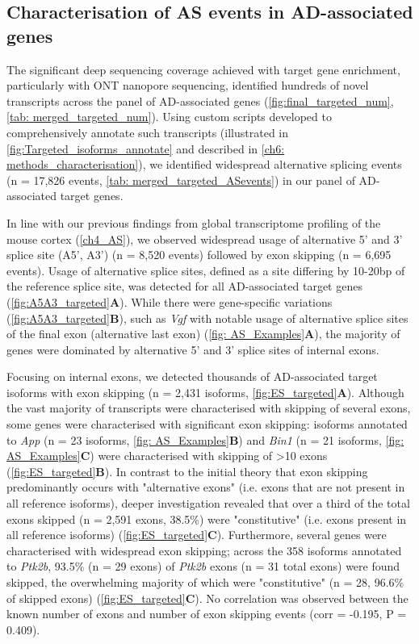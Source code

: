 \begin{figure}[!htp]
	\label{fig:ont_isoseq_description}
\end{figure}


\clearpage

\subsection{Characterisation of AS events in AD-associated genes}
The significant deep sequencing coverage achieved with target gene enrichment, particularly with ONT nanopore sequencing, identified hundreds of novel transcripts across the panel of AD-associated genes (\cref{fig:final_targeted_num}, \cref{tab: merged_targeted_num}). Using custom scripts developed to comprehensively annotate such transcripts (illustrated in \cref{fig:Targeted_isoforms_annotate} and described in \cref{ch6: methods_characterisation}), we identified widespread alternative splicing events (n = 17,826 events, \cref{tab: merged_targeted_ASevents}) in our panel of AD-associated target genes.

In line with our previous findings from global transcriptome profiling of the mouse cortex (\cref{ch4_AS}), we observed widespread usage of alternative 5' and 3' splice site (A5', A3') (n = 8,520 events) followed by exon skipping (n = 6,695 events). Usage of alternative splice sites, defined as a site differing by 10-20bp of the reference splice site, was detected for all AD-associated target genes (\cref{fig:A5A3_targeted}\textbf{A}). While there were gene-specific variations (\cref{fig:A5A3_targeted}\textbf{B}), such as \textit{Vgf} with notable usage of alternative splice sites of the final exon (alternative last exon) (\cref{fig: AS_Examples}\textbf{A}), the majority of genes were dominated by alternative 5' and 3' splice sites of internal exons.

Focusing on internal exons, we detected thousands of AD-associated target isoforms with exon skipping (n = 2,431 isoforms, \cref{fig:ES_targeted}\textbf{A}). Although the vast majority of transcripts were characterised with skipping of several exons, some genes were characterised with significant exon skipping: isoforms annotated to \textit{App} (n = 23 isoforms, \cref{fig: AS_Examples}\textbf{B}) and \textit{Bin1} (n = 21 isoforms, \cref{fig: AS_Examples}\textbf{C}) were characterised with skipping of >10 exons (\cref{fig:ES_targeted}\textbf{B}). In contrast to the initial theory that exon skipping predominantly occurs with "alternative exons" (i.e. exons that are not present in all reference isoforms), deeper investigation revealed that over a third of the total exons skipped (n = 2,591 exons, 38.5\%) were "constitutive" (i.e. exons present in all reference isoforms) (\cref{fig:ES_targeted}\textbf{C}). Furthermore, several genes were characterised with widespread exon skipping; across the 358 isoforms annotated to \textit{Ptk2b}, 93.5\% (n = 29 exons)  of \textit{Ptk2b} exons (n = 31 total exons) were found skipped, the overwhelming majority of which were "constitutive" (n = 28, 96.6\% of skipped exons) (\cref{fig:ES_targeted}\textbf{C}). No correlation was observed between the known number of exons and number of exon skipping events (corr = -0.195, P = 0.409). 

